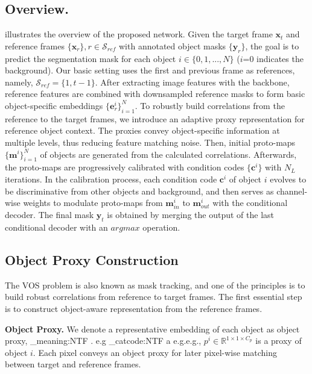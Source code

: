 \documentclass[sigconf]{acmart}
\makeatletter
\newcommand\latinabbrev[1]{
	\peek_meaning:NTF . {#1\@}{ \peek_catcode:NTF a {#1.\@ }{#1.\@}}}
\def\eg{\latinabbrev{e.g}}
\makeatother
\begin{document}
\subsection{Overview.}
\label{sec:method/overview}
\fig{\ref{fig:PIPELINE}} illustrates the overview of the proposed network.
Given the target frame $\mathbf{x}_t$ and reference frames $\{\mathbf{x}_{r}\}, r \in \mathcal{S}_{ref}$ with annotated object masks $\{\mathbf{y}_{r}\}$, the goal is to predict the segmentation mask for each object $i\in\{0,1,...,N\}$ ($i$=0 indicates the background). Our basic setting uses the first and previous frame as references, namely, $\mathcal{S}_{ref}=\{1, t-1\}$.
After extracting image features with the backbone, reference features are combined with downsampled reference masks to form basic object-specific embeddings $\{ \mathbf{e}_r^i \}_{i=1}^N$. To robustly build correlations from the reference to the target frames, we introduce an adaptive proxy representation for reference object context. The proxies convey object-specific information at multiple levels, thus reducing feature matching noise. Then, initial proto-maps $\{\mathbf{m}^i\}_{i=1}^N$ of objects are generated from the calculated correlations. Afterwards, the proto-maps are progressively calibrated with condition codes $\{ \mathbf{c}^i \}$ with $N_L$ iterations. In the calibration process, each condition code $\mathbf{c}^i$ of object $i$ evolves to be discriminative from other objects and background, and then serves as channel-wise weights to modulate proto-maps from $\mathbf{m}_{in}^i$ to $\mathbf{m}_{out}^i$ with the conditional decoder. 
The final mask $\mathbf{y}_t$ is obtained by merging the output of the last conditional decoder with an {$argmax$} operation.


\subsection{Object Proxy Construction}
\label{sec:method/metric_learning}
The VOS problem is also known as mask tracking, and one of the principles is to build robust correlations from reference to target frames. The first essential step is to construct object-aware representation from the reference frames.

\noindent
\textbf{Object Proxy.}
We denote a representative embedding of each object as object proxy, \eg, $p^i \in \mathbb{R}^{1\times 1 \times C_p}$ is a proxy of object $i$. Each pixel conveys an object proxy for later pixel-wise matching between target and reference frames.
\end{document}
